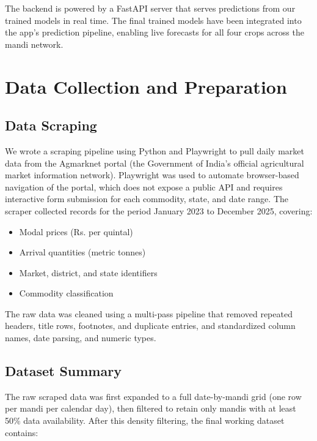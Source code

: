 \documentclass[12pt]{article}
\begin{document}
The backend is powered by a FastAPI server that serves predictions from our trained models in real time. The final trained models have been integrated into the app's prediction pipeline, enabling live forecasts for all four crops across the mandi network.

\section{Data Collection and Preparation}

\subsection{Data Scraping}

We wrote a scraping pipeline using Python and Playwright to pull daily market data from the Agmarknet portal (the Government of India's official agricultural market information network). Playwright was used to automate browser-based navigation of the portal, which does not expose a public API and requires interactive form submission for each commodity, state, and date range. The scraper collected records for the period January 2023 to December 2025, covering:

\begin{itemize}
\item Modal prices (Rs. per quintal)
\item Arrival quantities (metric tonnes)
\item Market, district, and state identifiers
\item Commodity classification
\end{itemize}

The raw data was cleaned using a multi-pass pipeline that removed repeated headers, title rows, footnotes, and duplicate entries, and standardized column names, date parsing, and numeric types.

\subsection{Dataset Summary}

The raw scraped data was first expanded to a full date-by-mandi grid (one row per mandi per calendar day), then filtered to retain only mandis with at least 50\% data availability. After this density filtering, the final working dataset contains:
\end{document}
